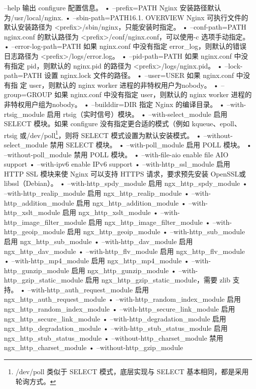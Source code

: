 \begin{compactitem}
\item --help
输出 configure 配置信息。
• --prefix=PATH 
Nginx 安装路径默认为/usr/local/nginx.
• --sbin-path=PATH16.1. OVERVIEW
Nginx 可执行文件的默认安装路径为 <prefix>/sbin/nginx，只能安装时指定。
• --conf-path=PATH
nginx.conf 的默认路径为 <prefix>/conf/nginx.conf，可以使用-c 选项手动指定。
• --error-log-path=PATH
如果 nginx.conf 中没有指定 error_log，则默认的错误日志路径为 <prefix>/logs/error.log。
• --pid-path=PATH
如果 nginx.conf 中没有指定 pid，则默认的 nginx.pid 的路径为 <prefix>/logs/nginx.pid。
• --lock-path=PATH
设置 nginx.lock 文件的路径。
• --user=USER
如果 nginx.conf 中没 有指 定 user，则默认的 nginx worker 进程的非特权用户为nobody。
• --group=GROUP
如果 nginx.conf 中没有指定 user，则默认的 nginx worker 进程的非特权用户组为nobody。
• --builddir=DIR
指定 Nginx 的编译目录。
• --with-rtsig_module
启用 rtsig（实时信号）模块。
• --with-select_module
启用 SELECT 模块。如果 configure 没有指定更合适的模式（例如 kqueue、epoll、rtsig 或/dev/poll\footnote{/dev/poll 类似于 SELECT 模式，底层实现与 SELECT 基本相同，都是采用轮询方式。}，则将 SELECT 模式设置为默认安装模式。
• --without-select_module
禁用 SELECT 模块。
• --with-poll_module
启用 POLL 模块。
• --without-poll_module
禁用 POLL 模块。
• --with-file-aio enable file AIO support
• --with-ipv6 enable IPv6 support
• --with-http_ssl_module
启用 HTTP SSL 模块来使 Nginx 可以支持 HTTPS 请求，要求预先安装 OpenSSL或libssl（Debian）。
• --with-http_spdy_module
启用 ngx_http_spdy_module
• --with-http_realip_module
启用 ngx_http_realip_module
• --with-http_addition_module
启用 ngx_http_addition_module
• --with-http_xslt_module
启用 ngx_http_xslt_module
• --with-http_image_filter_module
启用 ngx_http_image_filter_module
• --with-http_geoip_module
启用 ngx_http_geoip_module
• --with-http_sub_module
启用 ngx_http_sub_module
• --with-http_dav_module
启用 ngx_http_dav_module
• --with-http_flv_module
启用 ngx_http_flv_module
• --with-http_mp4_module
启用 ngx_http_mp4_module
• --with-http_gunzip_module
启用 ngx_http_gunzip_module
• --with-http_gzip_static_module
启用 ngx_http_gzip_static_module，需要 zlib 支持。
• --with-http_auth_request_module
启用 ngx_http_auth_request_module
• --with-http_random_index_module
启用 ngx_http_random_index_module
• --with-http_secure_link_module
启用 ngx_http_secure_link_module
• --with-http_degradation_module
启用 ngx_http_degradation_module
• --with-http_stub_status_module
启用 ngx_http_stub_status_module
• --without-http_charset_module
禁用 ngx_http_charset_module
• --without-http_gzip_module

\end{compactitem}
